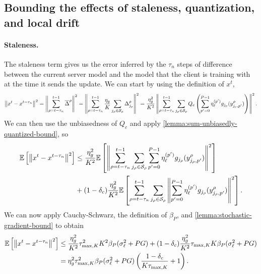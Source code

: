 \subsection{Bounding the effects of staleness, quantization, and local drift}
\label{sec:bounding-staleness-quantization-drift}

\paragraph{Staleness.}
The staleness term gives us the error inferred by the $\tau_n$ steps of difference between the current server model and the model that the client is training with at the time it sends the update.
We can start by using the definition of $x^t$,
\begin{equation}
    \begin{aligned}
        \left\lVert x^t - x^{t-\tau_n}\right\rVert^2 = \left\lVert\sum^{t-1}_{\rho=t-\tau_n} \overline{\Delta}^\rho \right\rVert^2 = \left\lVert\sum^{t-1}_{\rho=t-\tau_n} \frac{\eta_g}{K} \sum_{j_\rho \in \mathcal{S}_{\rho}} \Delta_{j_\rho}^{\rho}\right\rVert^2 = \frac{\eta^2_g}{K^2}\left\lVert\sum^{t-1}_{\rho=t-\tau_n} \sum_{j_\rho \in \mathcal{S}_{\rho}} Q_c \left( \sum_{p'=0}^{P-1} \eta^{(p')}_{\ell}  g_{j_\rho}(y^{\rho}_{j_\rho, p'}) \right)\right\rVert^2.
    \end{aligned}
\end{equation}
We can then use the unbiasedness of $Q_c$ and apply \cref{lemma:sum-unbiasedly-quantized-bound}, so
\begin{equation}
    \begin{aligned}
        \mathbb{E}\left[\left\lVert x^t - x^{t-\tau_n}\right\rVert^2\right] & \leq \frac{\eta^2_g}{K^2}\mathbb{E}\left[\left\lVert\sum^{t-1}_{\rho=t-\tau_n} \sum_{j_\rho \in \mathcal{S}_{\rho}} \sum_{p'=0}^{P-1} \eta^{(p')}_{\ell}  g_{j_\rho}(y^{\rho}_{j_\rho, p'}) \right\rVert^2\right]             \\
                                            & + (1-\delta_c)\frac{\eta^2_g}{K^2} \mathbb{E}\left[\sum^{t-1}_{\rho=t-\tau_n} \sum_{j_\rho \in \mathcal{S}_{\rho}} \left\lVert \sum_{p'=0}^{P-1} \eta^{(p')}_{\ell}  g_{j_\rho}(y^{\rho}_{j_\rho, p'}) \right\rVert^2\right].
    \end{aligned}
\end{equation}
We can now apply Cauchy-Schwarz, the definition of $\beta_P$, and \cref{lemma:stochastic-gradient-bound} to obtain
\begin{equation} \label{eq:bound-staleness}
    \begin{aligned}
        \mathbb{E}\left[\left\lVert x^t - x^{t-\tau_n}\right\rVert^2\right] & \leq \frac{\eta^2_g}{K^2}\tau_{\max,K}^2K^2 \beta_P (\sigma_{\ell}^2 + PG ) + (1-\delta_c)\frac{\eta^2_g}{K^2} \tau_{\max,K} K \beta_P  (\sigma_{\ell}^2 + PG) \\
                                            & = \eta^2_g \tau_{\max,K}^2 \beta_P  (\sigma_{\ell}^2 + PG) \left (\frac{1-\delta_c}{K \tau_{\max, K}} + 1 \right).
    \end{aligned}
\end{equation}

